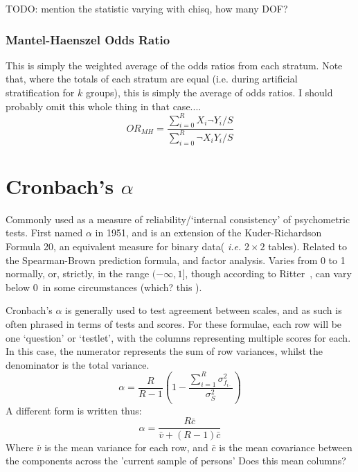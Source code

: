 \documentclass[11pt]{article}
\begin{document}
TODO: mention the statistic varying with chisq, how many DOF?

\subsubsection{Mantel-Haenszel Odds Ratio}
This is simply the weighted average of the odds ratios from each stratum.  Note that, where the totals of each stratum are equal (i.e. during artificial stratification for $k$ groups), this is simply the average of odds ratios.  {\color{red} I should probably omit this whole thing in that case...}.
$$
OR_{MH} = \frac{ { \sum_{i=0}^{R}{ X_i ¬Y_i } / S } }{ { \sum_{i=0}^{R}{ ¬X_i Y_i } / S} }
$$















\section{Cronbach's $\alpha$}
Commonly used as a measure of reliability/`internal consistency' of psychometric tests.  First named $\alpha$ in 1951, and is an extension of the Kuder-Richardson Formula 20, an equivalent measure for binary data( \textsl{i.e.} $2\times 2$ tables).  Related to the Spearman-Brown prediction formula, and factor analysis.  Varies from 0 to 1 normally, or, strictly, in the range $(-\infty, 1]$, though according to Ritter~\cite{ritter2010understanding}, can vary below 0~in some circumstances {\color{red} (which? this \cite{cronbachalphanegative} )}. \cite{bland1997statistics}

Cronbach's $\alpha$ is generally used to test agreement between scales, and as such is often phrased in terms of tests and scores.  For these formulae, each row will be one `question' or `testlet', with the columns representing multiple scores for each.  In this case, the numerator represents the sum of row variances, whilst the denominator is the total variance.
$$
\alpha = \frac{ R }{ R - 1 }   \left( 1 - \frac{ \sum_{i=1}^{R}{ \sigma_{f_{i\cdot}}^2 }    }{  \sigma_{S}^2  } \right) 
$$
A different form is written thus:
$$
\alpha = \frac{ R\bar{c} }{ \bar{v} + (R - 1)\bar{c} }
$$
Where $\bar{v}$ is the mean variance for each row, and $\bar{c}$ is the mean covariance between the components across the 'current sample of persons' {\color{red} Does this mean columns?}
\end{document}
